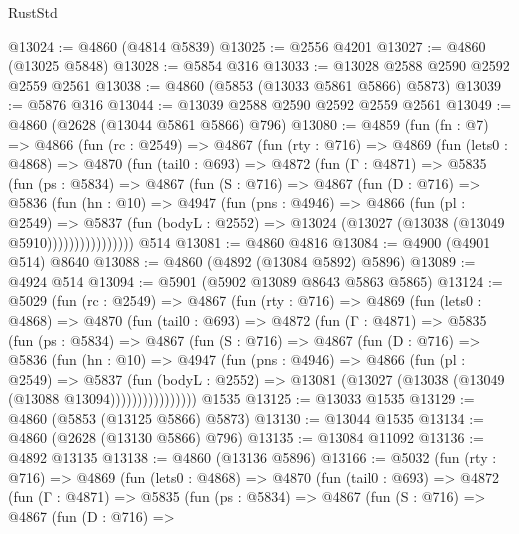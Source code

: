 \begin{lexlean}{RustStd}
\begin{coremodule}
@13024 := @4860 (@4814 @5839)
@13025 := @2556 @4201
@13027 := @4860 (@13025 @5848)
@13028 := @5854 @316
@13033 := @13028 @2588 @2590 @2592 @2559 @2561
@13038 := @4860 (@5853 (@13033 @5861 @5866) @5873)
@13039 := @5876 @316
@13044 := @13039 @2588 @2590 @2592 @2559 @2561
@13049 := @4860 (@2628 (@13044 @5861 @5866) @796)
@13080 := @4859
    (fun (fn : @7) =>
    @4866
      (fun (rc : @2549) =>
      @4867
        (fun (rty : @716) =>
        @4869
          (fun (lets0 : @4868) =>
          @4870
            (fun (tail0 : @693) =>
            @4872
              (fun (Γ : @4871) =>
              @5835
                (fun (ps : @5834) =>
                @4867
                  (fun (S : @716) =>
                  @4867
                    (fun (D : @716) =>
                    @5836
                      (fun (hn : @10) =>
                      @4947
                        (fun (pns : @4946) =>
                        @4866
                          (fun (pl : @2549) =>
                          @5837
                            (fun (bodyL : @2552) =>
                            @13024 (@13027 (@13038 (@13049 @5910))))))))))))))))
    @514
@13081 := @4860 @4816
@13084 := @4900 (@4901 @514) @8640
@13088 := @4860 (@4892 (@13084 @5892) @5896)
@13089 := @4924 @514
@13094 := @5901 (@5902 @13089 @8643 @5863 @5865)
@13124 := @5029
    (fun (rc : @2549) =>
    @4867
      (fun (rty : @716) =>
      @4869
        (fun (lets0 : @4868) =>
        @4870
          (fun (tail0 : @693) =>
          @4872
            (fun (Γ : @4871) =>
            @5835
              (fun (ps : @5834) =>
              @4867
                (fun (S : @716) =>
                @4867
                  (fun (D : @716) =>
                  @5836
                    (fun (hn : @10) =>
                    @4947
                      (fun (pns : @4946) =>
                      @4866
                        (fun (pl : @2549) =>
                        @5837
                          (fun (bodyL : @2552) =>
                          @13081 (@13027 (@13038 (@13049 (@13088 @13094))))))))))))))))
    @1535
@13125 := @13033 @1535
@13129 := @4860 (@5853 (@13125 @5866) @5873)
@13130 := @13044 @1535
@13134 := @4860 (@2628 (@13130 @5866) @796)
@13135 := @13084 @11092
@13136 := @4892 @13135
@13138 := @4860 (@13136 @5896)
@13166 := @5032
    (fun (rty : @716) =>
    @4869
      (fun (lets0 : @4868) =>
      @4870
        (fun (tail0 : @693) =>
        @4872
          (fun (Γ : @4871) =>
          @5835
            (fun (ps : @5834) =>
            @4867
              (fun (S : @716) =>
              @4867
                (fun (D : @716) =>

\end{coremodule}
\end{lexlean}
